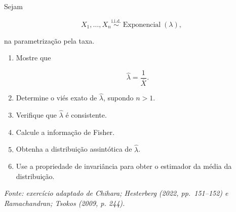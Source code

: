 \documentclass[
  letterpaper,
  DIV=11,
  numbers=noendperiod]{scrreprt}
\begin{document}
\begin{tcolorbox}[enhanced jigsaw, colback=white, leftrule=.75mm, colbacktitle=quarto-callout-tip-color!10!white, breakable, titlerule=0mm, bottomtitle=1mm, title=\textcolor{quarto-callout-tip-color}{\faLightbulb}\hspace{0.5em}{Exercício 3 --- Distribuição exponencial}, colframe=quarto-callout-tip-color-frame, toprule=.15mm, opacityback=0, bottomrule=.15mm, opacitybacktitle=0.6, arc=.35mm, toptitle=1mm, rightrule=.15mm, coltitle=black, left=2mm]

Sejam

\[X_1,\ldots,X_n
\overset{\mathrm{i.i.d.}}{\sim}
\operatorname{Exponencial}(\lambda),\]

na parametrização pela taxa.

\begin{enumerate}
\def\labelenumi{\arabic{enumi}.}
\item
  Mostre que

  \[\widehat\lambda
  =
  \frac{1}{\overline X}.\]
\item
  Determine o viés exato de \(\widehat\lambda\), supondo \(n>1\).
\item
  Verifique que \(\widehat\lambda\) é consistente.
\item
  Calcule a informação de Fisher.
\item
  Obtenha a distribuição assintótica de \(\widehat\lambda\).
\item
  Use a propriedade de invariância para obter o estimador da média da
  distribuição.
\end{enumerate}

\emph{Fonte: exercício adaptado de Chihara; Hesterberg (2022,
pp.~151--152) e Ramachandran; Tsokos (2009, p. 244).}

\end{tcolorbox}
\end{document}
